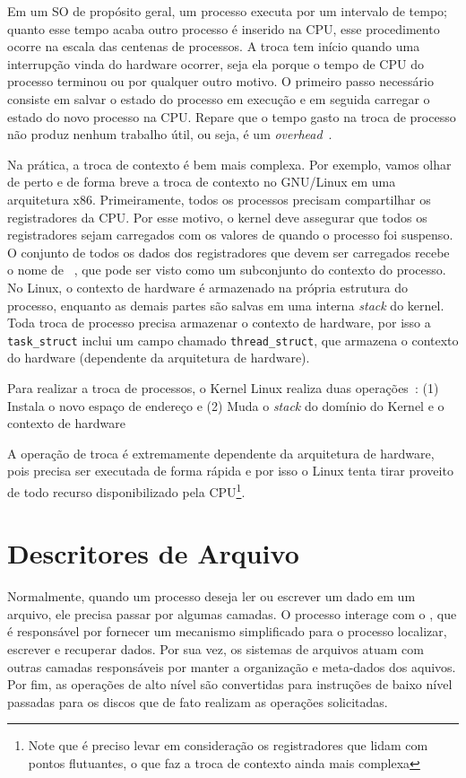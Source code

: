 Em um SO de propósito geral, um processo executa por um intervalo de tempo;
quanto esse tempo acaba outro processo é inserido na CPU, esse procedimento
ocorre na escala das centenas de processos. A troca tem início quando uma
interrupção vinda do hardware ocorrer, seja ela porque o tempo de CPU do
processo terminou ou por qualquer outro motivo. O primeiro passo necessário
consiste em salvar o estado do processo em execução e em seguida carregar o
estado do novo processo na CPU. Repare que o tempo gasto na troca de processo
não produz nenhum trabalho útil, ou seja, é um
\textit{overhead}~\citep{silberschatz}.

Na prática, a troca de contexto é bem mais complexa. Por exemplo, vamos olhar
de perto e de forma breve a troca de contexto no GNU/Linux em uma arquitetura
x86.  Primeiramente, todos os processos precisam compartilhar os registradores
da CPU. Por esse motivo, o kernel deve assegurar que todos os registradores
sejam carregados com os valores de quando o processo foi suspenso. O conjunto
de todos os dados dos registradores que devem ser carregados recebe o nome de
~\citep{entendendo_kernel}, que pode ser
visto como um subconjunto do contexto do processo. No Linux, o contexto de
hardware é armazenado na própria estrutura do processo, enquanto as demais
partes são salvas em uma interna \emph{stack} do kernel. Toda troca de processo
precisa armazenar o contexto de hardware, por isso a \texttt{task\_struct}
inclui um campo chamado \texttt{thread\_struct}, que armazena o contexto do
hardware (dependente da arquitetura de hardware).

Para realizar a troca de processos, o Kernel Linux realiza duas
operações~\citep{entendendo_kernel}: (1) Instala o novo espaço de endereço e
(2) Muda o \emph{stack} do domínio do Kernel e o contexto de hardware

A operação de troca é extremamente dependente da arquitetura de hardware, pois
precisa ser executada de forma rápida e por isso o Linux tenta tirar proveito
de todo recurso disponibilizado pela CPU\footnote{Note que é preciso levar em
consideração os registradores que lidam com pontos flutuantes, o que faz a troca
de contexto ainda mais complexa}.

\section{Descritores de Arquivo}

Normalmente, quando um processo deseja ler ou escrever um dado em um arquivo,
ele precisa passar por algumas camadas. O processo interage com o
, que é responsável por fornecer um mecanismo
simplificado para o processo localizar, escrever e recuperar dados. Por sua
vez, os sistemas de arquivos atuam com outras camadas responsáveis por manter a
organização e meta-dados dos aquivos. Por fim, as operações de alto nível são
convertidas para instruções de baixo nível passadas para os discos que de fato
realizam as operações solicitadas.

